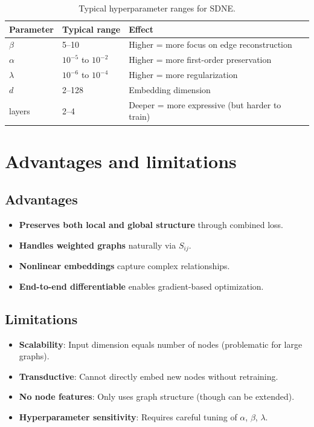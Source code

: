 \begin{notechapter}
\begin{table}[h]
\centering
\begin{tabular}{@{}lll@{}}
\toprule
Parameter & Typical range & Effect \\ \midrule
$\beta$ & 5--10 & Higher = more focus on edge reconstruction \\
$\alpha$ & $10^{-5}$ to $10^{-2}$ & Higher = more first-order preservation \\
$\lambda$ & $10^{-6}$ to $10^{-4}$ & Higher = more regularization \\
$d$ & 2--128 & Embedding dimension \\
layers & 2--4 & Deeper = more expressive (but harder to train) \\ \bottomrule
\end{tabular}
\caption{Typical hyperparameter ranges for SDNE.}
\end{table}

\section{Advantages and limitations}

\subsection{Advantages}

\begin{itemize}
    \item \textbf{Preserves both local and global structure} through combined loss.
    \item \textbf{Handles weighted graphs} naturally via $S_{ij}$.
    \item \textbf{Nonlinear embeddings} capture complex relationships.
    \item \textbf{End-to-end differentiable} enables gradient-based optimization.
\end{itemize}

\subsection{Limitations}

\begin{itemize}
    \item \textbf{Scalability}: Input dimension equals number of nodes (problematic for large graphs).
    \item \textbf{Transductive}: Cannot directly embed new nodes without retraining.
    \item \textbf{No node features}: Only uses graph structure (though can be extended).
    \item \textbf{Hyperparameter sensitivity}: Requires careful tuning of $\alpha$, $\beta$, $\lambda$.
\end{itemize}


\end{notechapter}
